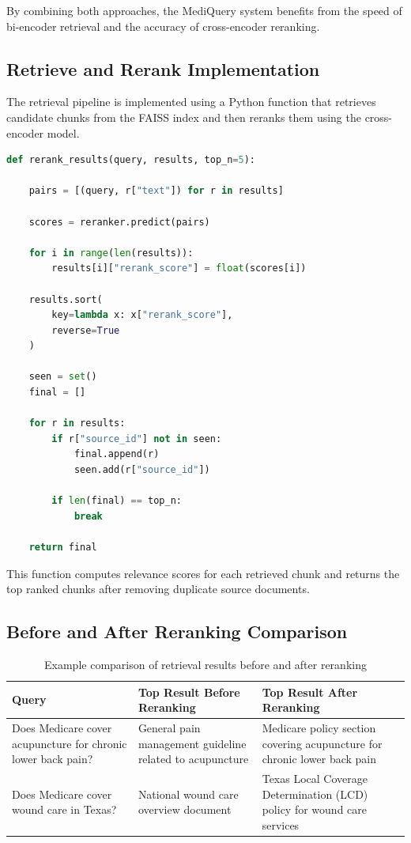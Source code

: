 \documentclass[10pt, letterpaper]{article}
\begin{document}
By combining both approaches, the MediQuery system benefits from the speed of bi-encoder retrieval and the accuracy of cross-encoder reranking.

\subsection{Retrieve and Rerank Implementation}

The retrieval pipeline is implemented using a Python function that retrieves candidate chunks from the FAISS index and then reranks them using the cross-encoder model.

\begin{lstlisting}[language=Python]
def rerank_results(query, results, top_n=5):

    pairs = [(query, r["text"]) for r in results]

    scores = reranker.predict(pairs)

    for i in range(len(results)):
        results[i]["rerank_score"] = float(scores[i])

    results.sort(
        key=lambda x: x["rerank_score"],
        reverse=True
    )

    seen = set()
    final = []

    for r in results:
        if r["source_id"] not in seen:
            final.append(r)
            seen.add(r["source_id"])

        if len(final) == top_n:
            break

    return final
\end{lstlisting}

This function computes relevance scores for each retrieved chunk and returns the top ranked chunks after removing duplicate source documents.

\subsection{Before and After Reranking Comparison}

\begin{table}[h]
\centering
\begin{tabular}{p{4cm} p{5cm} p{5cm}}
\toprule
\textbf{Query} & \textbf{Top Result Before Reranking} & \textbf{Top Result After Reranking} \\
\midrule
Does Medicare cover acupuncture for chronic lower back pain? &
General pain management guideline related to acupuncture &
Medicare policy section covering acupuncture for chronic lower back pain \\
\addlinespace
Does Medicare cover wound care in Texas? &
National wound care overview document &
Texas Local Coverage Determination (LCD) policy for wound care services \\
\bottomrule
\end{tabular}
\caption{Example comparison of retrieval results before and after reranking}
\end{table}
\end{document}
